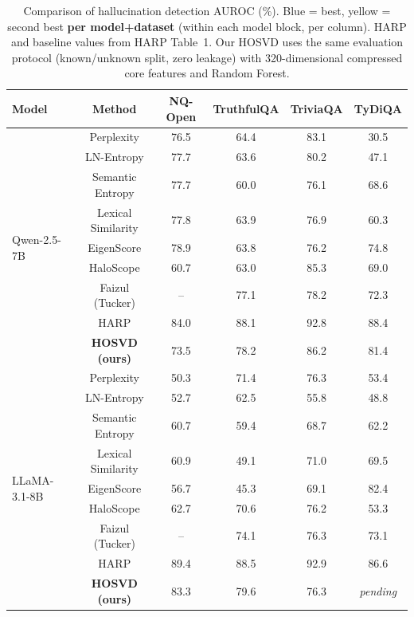 \documentclass[11pt,a4paper]{article}
\begin{document}
\begin{table}[h]
\centering
\small
\begin{tabular}{lccccc}
\toprule
\textbf{Model} & \textbf{Method} & \textbf{NQ-Open} & \textbf{TruthfulQA} & \textbf{TriviaQA} & \textbf{TyDiQA} \\
\midrule
\multirow{9}{*}{Qwen-2.5-7B}
  & Perplexity        & 76.5 & 64.4 & 83.1 & 30.5 \\
  & LN-Entropy        & 77.7 & 63.6 & 80.2 & 47.1 \\
  & Semantic Entropy  & 77.7 & 60.0 & 76.1 & 68.6 \\
  & Lexical Similarity& 77.8 & 63.9 & 76.9 & 60.3 \\
  & EigenScore        & 78.9 & 63.8 & 76.2 & 74.8 \\
  & HaloScope         & 60.7 & 63.0 & 85.3 & 69.0 \\
  & Faizul (Tucker)   & --   & 77.1 & 78.2 & 72.3 \\
  & HARP              & \cellcolor{bestblue}84.0 & \cellcolor{bestblue}88.1 & \cellcolor{bestblue}92.8 & \cellcolor{bestblue}88.4 \\
  & \textbf{HOSVD (ours)} & 73.5 & \cellcolor{secondyellow}78.2 & \cellcolor{secondyellow}86.2 & \cellcolor{secondyellow}81.4 \\
\midrule
\multirow{9}{*}{LLaMA-3.1-8B}
  & Perplexity        & 50.3 & 71.4 & 76.3 & 53.4 \\
  & LN-Entropy        & 52.7 & 62.5 & 55.8 & 48.8 \\
  & Semantic Entropy  & 60.7 & 59.4 & 68.7 & 62.2 \\
  & Lexical Similarity& 60.9 & 49.1 & 71.0 & 69.5 \\
  & EigenScore        & 56.7 & 45.3 & 69.1 & 82.4 \\
  & HaloScope         & 62.7 & 70.6 & 76.2 & 53.3 \\
  & Faizul (Tucker)   & --   & 74.1 & 76.3 & 73.1 \\
  & HARP              & \cellcolor{bestblue}89.4 & \cellcolor{bestblue}88.5 & \cellcolor{bestblue}92.9 & \cellcolor{bestblue}86.6 \\
  & \textbf{HOSVD (ours)} & \cellcolor{secondyellow}83.3 & \cellcolor{secondyellow}79.6 & \cellcolor{secondyellow}76.3 & \textit{pending} \\
\bottomrule
\end{tabular}
\caption{Comparison of hallucination detection AUROC (\%).  Blue = best,
         yellow = second best \textbf{per model+dataset}
         (within each model block, per column).  HARP and baseline
         values from HARP Table~1.  Our HOSVD uses the same evaluation
         protocol (known/unknown split, zero leakage) with 320-dimensional
         compressed core features and Random Forest.}
\end{table}
\end{document}
